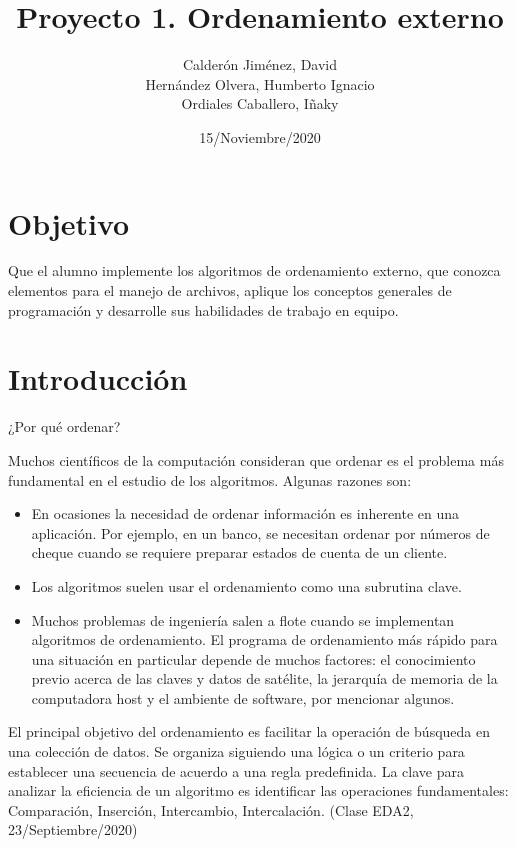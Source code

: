 \documentclass[letter]{report}
\title{Proyecto 1. Ordenamiento externo}
\author{
        Calderón Jiménez, David
    \\  Hernández Olvera, Humberto Ignacio
    \\  Ordiales Caballero, Iñaky
    }
\date{15/Noviembre/2020}
\newcommand{\sizefont}{%
\fontsize{13}{16}\selectfont}
\begin{document}
\vspace{-30cm}
\maketitle
\fancyhf{}
\fancyfoot[R]{\sizefont Página \thepage}


\section*{Objetivo}
Que el alumno implemente los algoritmos de ordenamiento externo, que conozca elementos para el manejo de archivos, aplique los conceptos generales de programación y desarrolle sus habilidades de trabajo en equipo.

\section*{Introducción}
¿Por qué ordenar?\cite{PrimeraRef}\medskip

Muchos científicos de la computación consideran que ordenar es el problema más fundamental en el estudio de los algoritmos. Algunas razones son:

\begin{itemize}
    \item En ocasiones la necesidad de ordenar información es inherente en una aplicación. Por ejemplo, en un banco, se necesitan ordenar por números de cheque cuando se requiere preparar estados de cuenta de un cliente.
    \item Los algoritmos suelen usar el ordenamiento como una subrutina clave.
    \item Muchos problemas de ingeniería salen a flote cuando se implementan algoritmos de ordenamiento. El programa de ordenamiento más rápido para una situación en particular depende de muchos factores: el conocimiento previo acerca de las claves y datos de satélite, la jerarquía de memoria de la computadora host y el ambiente de software, por mencionar algunos.
\end{itemize}

El principal objetivo del ordenamiento es facilitar la operación de búsqueda en una colección de datos. Se organiza siguiendo una lógica o un criterio para establecer una secuencia de acuerdo a una regla predefinida. La clave para analizar la eficiencia de un algoritmo es identificar las operaciones fundamentales: Comparación, Inserción, Intercambio, Intercalación. (Clase EDA2, 23/Septiembre/2020)\medskip
\end{document}
